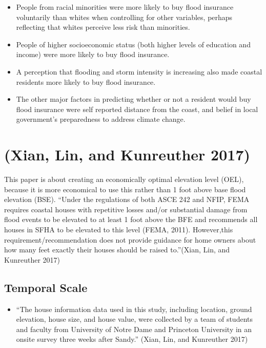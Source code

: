 \documentclass[
]{article}
\providecommand{\tightlist}{%
  \setlength{\itemsep}{0pt}\setlength{\parskip}{0pt}}
\begin{document}
\begin{itemize}
\tightlist
\item
  People from racial minorities were more likely to buy flood insurance
  voluntarily than whites when controlling for other variables, perhaps
  reflecting that whites perceive less risk than minorities.
\item
  People of higher socioeconomic status (both higher levels of education
  and income) were more likely to buy flood insurance.
\item
  A perception that flooding and storm intensity is increasing also made
  coastal residents more likely to buy flood insurance.
\item
  The other major factors in predicting whether or not a resident would
  buy flood insurance were self reported distance from the coast, and
  belief in local government's preparedness to address climate change.
\end{itemize}

\hypertarget{xian2017optimal}{%
\section{(Xian, Lin, and Kunreuther 2017)}\label{xian2017optimal}}

This paper is about creating an economically optimal elevation level
(OEL), because it is more economical to use this rather than 1 foot
above base flood elevation (BSE). ``Under the regulations of both ASCE
242 and NFIP, FEMA requires coastal houses with repetitive losses and/or
substantial damage from flood events to be elevated to at least 1 foot
above the BFE and recommends all houses in SFHA to be elevated to this
level (FEMA, 2011). However,this requirement/recommendation does not
provide guidance for home owners about how many feet exactly their
houses should be raised to.''(Xian, Lin, and Kunreuther 2017)

\hypertarget{temporal-scale-27}{%
\subsection{Temporal Scale}\label{temporal-scale-27}}

\begin{itemize}
\tightlist
\item
  ``The house information data used in this study, including location,
  ground elevation, house size, and house value, were collected by a
  team of students and faculty from University of Notre Dame and
  Princeton University in an onsite survey three weeks after Sandy.''
  (Xian, Lin, and Kunreuther 2017)
\end{itemize}
\end{document}
